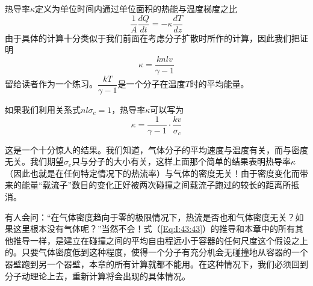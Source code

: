 热导率$\kappa$定义为单位时间内通过单位面积的热能与温度梯度之比
\begin{equation}
    \label{Eq:I:43:41}
    \frac{1}{A}\frac{dQ}{dt} = -\kappa\frac{dT}{dz}
\end{equation}
由于具体的计算十分类似于我们前面在考虑分子扩散时所作的计算，因此我们把证明
\begin{equation}
    \label{Eq:I:43:42}
    \kappa = \frac{knlv}{\gamma -1}
\end{equation}
留给读者作为一个练习。$\dfrac{kT}{\gamma -1}$是一个分子在温度$T$时的平均能量。

如果我们利用关系式$nl\sigma_c =1$，热导率$\kappa$可以写为
\begin{equation}
    \label{Eq:I:43:43}
    \kappa = \frac{1}{\gamma - 1}\cdot\frac{kv}{\sigma_c}
\end{equation}

这是一个十分惊人的结果。我们知道，气体分子的平均速度与温度有关，而与密度无关。我们期望$\sigma_c$只与分子的大小有关，这样上面那个简单的结果表明热导率$\kappa$（因此也就是在任何特定情况下的热流率）与气体的密度无关！由于密度变化而带来的能量“载流子”数目的变化正好被两次碰撞之间载流子跑过的较长的距离所抵消。

有人会问：“在气体密度趋向于零的极限情况下，热流是否也和气体密度无关？如果这里根本没有气体呢？”当然不会！式（\ref{Eq:I:43:43}）的推导和本章中的所有其他推导一样，是建立在碰撞之间的平均自由程远小于容器的任何尺度这个假设之上的。只要气体密度低到这种程度，使得一个分子有充分机会无碰撞地从容器的一个器壁跑到另一个器壁，本章的所有计算就都不能用。在这种情况下，我们必须回到分子动理论上去，重新计算将会出现的具体情况。